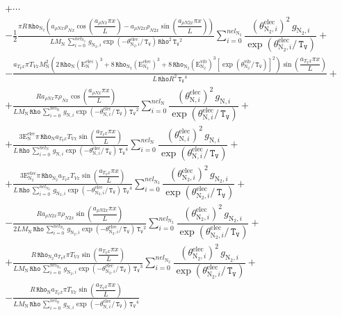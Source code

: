 \documentclass[10pt]{article}
\newcommand{\diff}[2] {\dfrac{\partial #1 }{\partial #2}}
\newcommand{\Rho}{\,\mathtt{Rho}}
\newcommand{\TV}{\,\mathtt{T_V}}
\newcommand{\N}{\text{N}}
\newcommand{\elec}{\text{elec}}
\newcommand{\vib}{\text{vib}}
\newcommand{\E}{\text{E}}
\newcommand{\DCpDx}{\diff{C_p}{x}\,}
\newcommand{\eelecNden}{\,\sum_{i=0}^{nel_{\N}}   \, g_{\N,i}   \exp \left( -\theta^{\elec}_{\N,i} / \TV  \right) }
\newcommand{\eelecNdoisden}{\,\sum_{i=0}^{nel_{\N_2}}  \, g_{\N_2,i}   \exp \left( -\theta^{\elec}_{\N_2,i} /  \TV \right)}
\begin{document}
\begin{equation*}
\begin{split} %
&+\cdots\\
&-  \frac{1}{2}\frac{\pi R \Rho_{\N_2}\left( a_{\rho N x} \rho_{N x} \cos\left(\dfrac{a_{\rho N x} \pi x}{L}\right) -  a_{\rho N2
x} \rho_{N2 x} \sin\left(\dfrac{a_{\rho N2 x} \pi x}{L}\right) \right)}{L M_{\N} \eelecNdoisden \Rho^{2} \TV^{2}} 
\sum_{i=0}^{nel_{\N_2}} \dfrac{ \left( \theta^{\elec}_{\N_2,i} \right)^2   \, g_{\N_2,i} }{ \exp \left( \theta^{\elec}_{\N_2,i} / 
\TV \right)}+\\
%
&- \frac{a_{T_V x} \pi T_{Vx} M_{\N}^{2} \left(2 \Rho_{\N} \left( \E^{\elec}_{\N} \right)^3 + 8 \Rho_{\N_2} \left(
\E^{\elec}_{\N_2} \right)^3 + 8 \Rho_{\N_2} \left( \E^{\vib}_{\N_2} \right)^3 \left[ \exp\left( \theta^{\vib}_{\N_2} / \TV \right)
\right]^2\right) \sin\left(\dfrac{a_{T_V x} \pi x}{L}\right)}{L \Rho R^{2} \TV^{4}} +\\
%
&+ \frac{R a_{\rho N x} \pi \rho_{N x} \cos\left(\dfrac{a_{\rho N x} \pi x}{L}\right)}{L M_{\N} \Rho \eelecNden \TV^{2}}
\sum_{i=0}^{nel_{\N}} \dfrac{ \left( \theta^{\elec}_{\N,i} \right)^2   \, g_{\N,i} }{ \exp \left( \theta^{\elec}_{\N,i} / \TV
\right)} +\\
%
&+ \frac{3 \E^{\elec}_{\N} \pi \Rho_{\N} a_{T_V x} T_{Vx} \sin\left(\dfrac{a_{T_V x} \pi x}{L}\right)}{L \Rho \eelecNden \TV^{4}}
\sum_{i=0}^{nel_{\N}} \dfrac{ \left( \theta^{\elec}_{\N,i} \right)^2   \, g_{\N,i} }{ \exp \left( \theta^{\elec}_{\N,i} / \TV
\right)}+\\
%
&+ \frac{3 \E^{\elec}_{\N_2} \pi \Rho_{\N_2} a_{T_V x} T_{Vx} \sin\left(\dfrac{a_{T_V x} \pi x}{L}\right)}{L \Rho \eelecNdoisden
\TV^{4}}  \sum_{i=0}^{nel_{\N_2}} \dfrac{ \left( \theta^{\elec}_{\N_2,i} \right)^2   \, g_{\N_2,i} }{ \exp \left(
\theta^{\elec}_{\N_2,i} /  \TV \right)}+\\
%
&- \frac{R a_{\rho N2 x} \pi \rho_{N2 x} \sin\left(\dfrac{a_{\rho N2 x} \pi x}{L}\right)}{2 L M_{\N} \Rho \eelecNdoisden \TV^{2}} 
\sum_{i=0}^{nel_{\N_2}} \dfrac{ \left( \theta^{\elec}_{\N_2,i} \right)^2   \, g_{\N_2,i} }{ \exp \left( \theta^{\elec}_{\N_2,i} / 
\TV \right)}+\\
%
&+ \frac{R \Rho_{\N_2} a_{T_V x} \pi T_{Vx} \sin\left(\dfrac{a_{T_V x} \pi x}{L}\right)}{L M_{\N} \Rho \eelecNdoisden \TV^{3}} 
\sum_{i=0}^{nel_{\N_2}} \dfrac{ \left( \theta^{\elec}_{\N_2,i} \right)^2   \, g_{\N_2,i} }{ \exp \left( \theta^{\elec}_{\N_2,i} / 
\TV \right)}+\\
%
&- \frac{R \Rho_{\N} a_{T_V x} \pi T_{Vx} \sin\left(\dfrac{a_{T_V x} \pi x}{L}\right)}{L M_{\N} \Rho \eelecNden \TV^{4}} 

\end{split}
\end{equation*}
\end{document}
